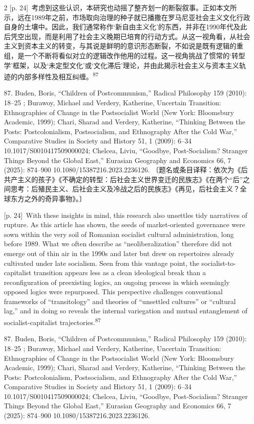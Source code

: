 \documentclass[10pt,a4paper]{article}
\begin{document}
\begin{paracol}{2}
{\scriptsize\color{gray} [p. 24]}\ 考虑到这些认识，本研究也动摇了整齐划一的断裂叙事。正如本文所示，远在1989年之前，市场取向治理的种子就已播撒在罗马尼亚社会主义文化行政自身的土壤中。因此，我们通常称作‘新自由主义化’的东西，并非在1990年代及此后凭空出现，而是利用了社会主义晚期已培育的行动方式。从这一视角看，从社会主义到资本主义的转变，与其说是鲜明的意识形态断裂，不如说是既有逻辑的重组，是一个不断将看似对立的逻辑改作他用的过程。这一视角挑战了惯常的‘转型学’框架，以及‘未定型文化’或‘文化滞后’理论，并由此揭示社会主义与资本主义轨迹的内部多样性及相互纠\mbox{缠。\textsuperscript{87}}\par{\small 87. Buden, Boris, “Children of Postcommunism,” Radical Philosophy 159 (2010): 18–25 ; Burawoy, Michael and Verdery, Katherine, Uncertain Transition: Ethnographies of Change in the Postsocialist World (New York: Bloomsbury Academic, 1999); Chari, Sharad and Verdery, Katherine, “Thinking Between the Posts: Postcolonialism, Postsocialism, and Ethnography After the Cold War,” Comparative Studies in Society and History 51, 1 (2009): 6–34 10.1017/S0010417509000024; Chelcea, Liviu, “Goodbye, Post-Socialism? Stranger Things Beyond the Global East,” Eurasian Geography and Economics 66, 7 (2025): 874–900 10.1080/15387216.2023.2236126. 〔题名或条目译释：依次为《后共产主义的孩子》《不确定的转型：后社会主义世界变迁的民族志》《在两个“后”之间思考：后殖民主义、后社会主义及冷战之后的民族志》《再见，后社会主义？全球东方之外的奇异事物》。〕\par}
\switchcolumn
{\scriptsize\color{gray} [p. 24]}\ With these insights in mind, this research also unsettles tidy narratives of rupture. As this article has shown, the seeds of market-oriented governance were sown within the very soil of Romanian socialist cultural administration, long before 1989. What we often describe as “neoliberalization” therefore did not emerge out of thin air in the 1990s and later but drew on repertoires already cultivated under late socialism. Seen from this vantage point, the socialist-to-capitalist transition appears less as a clean ideological break than a reconfiguration of preexisting logics, an ongoing process in which seemingly opposed logics were repurposed. This perspective challenges conventional frameworks of “transitology” and theories of “unsettled cultures” or “cultural lag,” and in doing so reveals the internal variegation and mutual entanglement of socialist-capitalist trajectories.\nobreak\textsuperscript{87}\par{\small 87. Buden, Boris, “Children of Postcommunism,” Radical Philosophy 159 (2010): 18–25 ; Burawoy, Michael and Verdery, Katherine, Uncertain Transition: Ethnographies of Change in the Postsocialist World (New York: Bloomsbury Academic, 1999); Chari, Sharad and Verdery, Katherine, “Thinking Between the Posts: Postcolonialism, Postsocialism, and Ethnography After the Cold War,” Comparative Studies in Society and History 51, 1 (2009): 6–34 10.1017/S0010417509000024; Chelcea, Liviu, “Goodbye, Post-Socialism? Stranger Things Beyond the Global East,” Eurasian Geography and Economics 66, 7 (2025): 874–900 10.1080/15387216.2023.2236126.\par}

\end{paracol}
\end{document}
